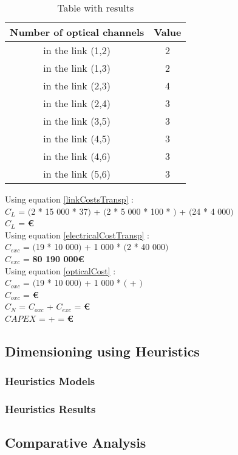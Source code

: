 \begin{table}[h!]
\centering
\begin{tabular}{|| c | c||}
 \hline
 Number of optical channels & Value \\
 \hline\hline
 in the link (1,2) & 2 \\
 in the link (1,3) & 2 \\
 in the link (2,3) & 4 \\
 in the link (2,4) & 3 \\
 in the link (3,5) & 3 \\
 in the link (4,5) & 3 \\
 in the link (4,6) & 3 \\
 in the link (5,6) & 3 \\
 \hline
\end{tabular}
\caption{Table with results}
\label{result_ILP4_T}
\end{table}

Using equation \ref{linkCostsTransp} : \\
$C_L$ = $($2 * 15 000 * 37$)$ + $($2 * 5 000 * 100 * $)$ + $($24 * 4 000$)$ \\
$C_L$ = \textbf{ \euro} \\

Using equation \ref{electricalCostTransp} : \\
$C_{exc}$ = $($19 * 10 000$)$ + 1 000 * $($2 * 40 000$)$ \\
$C_{exc}$ = \textbf{80 190 000\euro} \\

Using equation \ref{opticalCost} : \\
$C_{oxc}$ = $($19 * 10 000$)$ + 1 000 * $($ + $)$ \\
$C_{oxc}$ = \textbf{ \euro} \\
$C_N$ = $C_{oxc}$ + $C_{exc}$ = \textbf{ \euro} \\

$CAPEX$ =  +  = \textbf{ \euro}\\

\newpage

\subsection{Dimensioning using Heuristics}

\subsubsection{Heuristics Models}

\subsubsection{Heuristics Results}

\subsection{Comparative Analysis} 